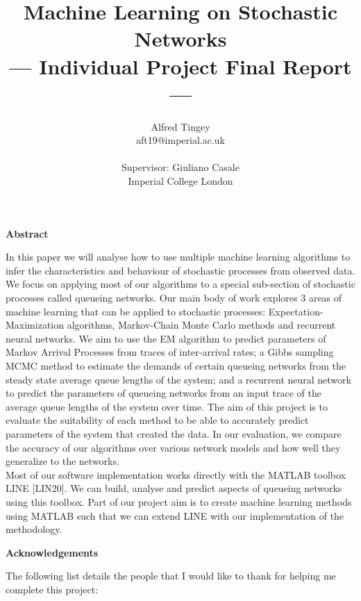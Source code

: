 \documentclass[a4paper,11pt,titlepage]{article}
\title{Machine Learning on Stochastic Networks\\\Large{--- Individual Project Final Report---}}
\author{Alfred Tingey\\
       aft19@imperial.ac.uk\\ \\
       \small{Supervisor: Giuliano Casale}\\
       \small{Imperial College London} 
}
\begin{document}
\maketitle

\large
\begin{center}
\textbf{Abstract} \\
\end{center}
In this paper we will analyse how to use multiple machine learning algorithms to infer the characteristics and behaviour of stochastic processes from observed data. We focus on applying most of our algorithms to a special sub-section of stochastic processes called queueing networks.  Our main body of work explores 3 areas of machine learning that can be applied to stochastic processes: Expectation-Maximization algorithms, Markov-Chain Monte Carlo methods and recurrent neural networks. We aim to use the EM algorithm to predict parameters of Markov Arrival Processes from traces of inter-arrival rates; a Gibbs sampling MCMC method to estimate the demands of certain queueing networks from the steady state average queue lengths of the system; and a recurrent neural network to predict the parameters of queueing networks from an input trace of the average queue lengths of the system over time. The aim of this project is to evaluate the suitability of each method to be able to accurately predict parameters of the system that created the data. In our evaluation, we compare the accuracy of our algorithms over various network models and how well they generalize to the networks. \\

Most of our software implementation works directly with the MATLAB toolbox LINE [LIN20]. We can build, analyse and predict aspects of queueing networks using this toolbox. Part of our project aim is to create machine learning methods using MATLAB such that we can extend LINE with our implementation of the methodology. 

\clearpage

\large
\begin{center}
\textbf{Acknowledgements} \\
\end{center}

The following list details the people that I would like to thank for helping me complete this project:
\end{document}
